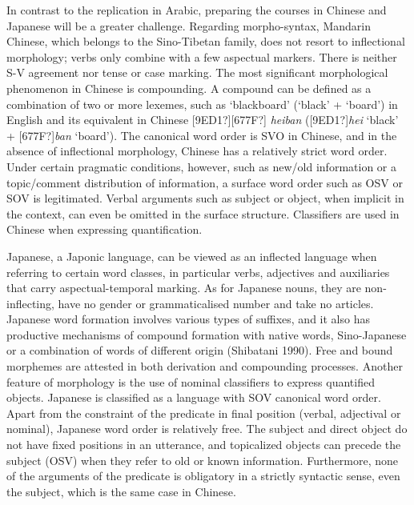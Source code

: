 \documentclass[12pt]{article}
\newenvironment{styleStandard}{\setlength\leftskip{0cm}\setlength\rightskip{0cm plus 1fil}\setlength\parindent{0cm}\setlength\parfillskip{0pt plus 1fil}\setlength\parskip{0cm plus 1pt}\writerlistparindent\writerlistleftskip\leavevmode\normalfont\normalsize\writerlistlabel\ignorespaces}{\unskip\vspace{0cm plus 1pt}\par}
\newcommand\writerlistleftskip{}
\newcommand\writerlistparindent{}
\newcommand\writerlistlabel{}
\begin{document}
\begin{styleStandard}
In contrast to the replication in Arabic, preparing the courses in Chinese and Japanese will be a greater challenge. Regarding morpho-syntax, Mandarin Chinese, which belongs to the Sino-Tibetan family, does not resort to inflectional morphology; verbs only combine with a few aspectual markers. There is neither S-V agreement nor tense or case marking. The most significant morphological phenomenon in Chinese is compounding. A compound can be defined as a combination of two or more lexemes, such as ‘blackboard’ (‘black’ + ‘board’) in English and its equivalent in Chinese [9ED1?][677F?] \textit{heiban} ([9ED1?]\textit{hei} ‘black’ + [677F?]\textit{ban} ‘board’). The canonical word order is SVO in Chinese, and in the absence of inflectional morphology, Chinese has a relatively strict word order. Under certain pragmatic conditions, however, such as new/old information or a topic/comment distribution of information, a surface word order such as OSV or SOV is legitimated. Verbal arguments such as subject or object, when implicit in the context, can even be omitted in the surface structure. Classifiers are used in Chinese when expressing quantification.
\end{styleStandard}

\begin{styleStandard}
Japanese, a Japonic language, can be viewed as an inflected language when referring to certain word classes, in particular verbs, adjectives and auxiliaries that carry aspectual-temporal marking. As for Japanese nouns, they are non-inflecting, have no gender or grammaticalised number and take no articles. Japanese word formation involves various types of suffixes, and it also has productive mechanisms of compound formation with native words, Sino-Japanese or a combination of words of different origin (Shibatani 1990). Free and bound morphemes are attested in both derivation and compounding processes. Another feature of morphology is the use of nominal classifiers to express quantified objects. Japanese is classified as a language with SOV canonical word order. Apart from the constraint of the predicate in final position (verbal, adjectival or nominal), Japanese word order is relatively free. The subject and direct object do not have fixed positions in an utterance, and topicalized objects can precede the subject (OSV) when they refer to old or known information. Furthermore, none of the arguments of the predicate is obligatory in a strictly syntactic sense, even the subject, which is the same case in Chinese.
\end{styleStandard}
\end{document}
